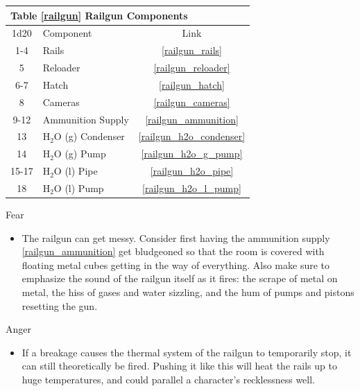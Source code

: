 \documentclass[a4paper]{article}
\begin{document}
\vspace{0.5cm} \hspace{0.25\linewidth}
\def\railgun_components{
\begin{tabular}[t]{@{} | c | l | c | @{}}
\toprule
\multicolumn{3}{|l|}{Table \ref{railgun} Railgun Components} \\
\toprule
1d20 & Component & Link \\
\midrule
1-4 & Rails & \ref{railgun_rails} \\
5 & Reloader & \ref{railgun_reloader} \\
6-7 & Hatch & \ref{railgun_hatch} \\
8 & Cameras & \ref{railgun_cameras} \\
9-12 & Ammunition Supply & \ref{railgun_ammunition} \\
\midrule
13 & H$_2$O (g) Condenser & \ref{railgun_h2o_condenser} \\
14 & H$_2$O (g) Pump & \ref{railgun_h2o_g_pump} \\
15-17 & H$_2$O (l) Pipe & \ref{railgun_h2o_pipe} \\
18 & H$_2$O (l) Pump & \ref{railgun_h2o_l_pump} \\
\bottomrule
\end{tabular}
}
\railgun_components

\vspace{0.3cm}
\begin{minipage}[t]{0.4\linewidth}
Fear
\begin{itemize}
\item The railgun can get messy. Consider first having the ammunition supply \ref{railgun_ammunition} get bludgeoned so that the room is covered with floating metal cubes getting in the way of everything. Also make sure to emphasize the sound of the railgun itself as it fires: the scrape of metal on metal, the hiss of gases and water sizzling, and the hum of pumps and pistons resetting the gun.
\end{itemize}
\end{minipage} 
\begin{minipage}[t]{0.4\linewidth}
Anger
\begin{itemize}
\item If a breakage causes the thermal system of the railgun to temporarily stop, it can still theoretically be fired. Pushing it like this will heat the rails up to huge temperatures, and could parallel a character's recklessness well.
\end{itemize}
\end{minipage}
\end{document}
